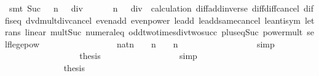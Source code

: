 \begin{isabellebody}
\ {\isacharparenleft}smt\ Suc{\isacharunderscore}{}\ {\isacartoucheopen}{\isacharparenleft}{}\ {\isacharcircum}\ n\ {\isacharminus}\ {}{\isacharparenright}\ div\ {}\ {\isacharminus}\ {}\ {\isacharequal}\ {\isacharparenleft}{}\ {\isacharcircum}\ n\ {\isacharminus}\ {}{\isacharparenright}\ div\ {}{\isacartoucheclose}\ calculation\ diff{\isacharunderscore}add{\isacharunderscore}inverse{}\ diff{\isacharunderscore}diff{\isacharunderscore}cancel\ diff{\isacharunderscore}is{\isacharunderscore}{}{\isacharunderscore}eq\ dvd{\isacharunderscore}mult{\isacharunderscore}div{\isacharunderscore}cancel\ even{\isacharunderscore}add\ even{\isacharunderscore}power\ le{\isacharunderscore}add{}\ le{\isacharunderscore}add{\isacharunderscore}same{\isacharunderscore}cancel{}\ le{\isacharunderscore}antisym\ le{\isacharunderscore}trans\ linear\ mult{\isacharunderscore}Suc\ numeral{\isacharunderscore}{}{\isacharunderscore}eq{\isacharunderscore}{}\ odd{\isacharunderscore}two{\isacharunderscore}times{\isacharunderscore}div{\isacharunderscore}two{\isacharunderscore}succ\ plus{\isacharunderscore}{}{\isacharunderscore}eq{\isacharunderscore}Suc\ power{\isacharunderscore}mult\ self{\isacharunderscore}le{\isacharunderscore}ge{}{\isacharunderscore}pow{\isacharparenright}\isanewline
\ \ \ \ \ \ \ \ \ \ \ \ \ \ \isamarkupfalse%
\ \isamarkupfalse%
\ {\isachardoublequoteopen}{\isacharparenleft}{\isacharparenleft}{}{\isacharcolon}{\isacharcolon}nat{\isacharparenright}{\isacharasterisk}{}{\isacharcircum}n\ {\isacharminus}\ {}{\isacharparenright}\ {\isacharplus}\ {\isacharparenleft}{}{\isacharcircum}n\ {\isacharplus}\ {}{\isacharparenright}\ {\isacharequal}\ {}{\isacharasterisk}{}{\isacharcircum}n{\isachardoublequoteclose}\isanewline
\ \ \ \ \ \ \ \ \ \ \ \ \ \ \ \ \isamarkupfalse%
\ simp\isanewline
\ \ \ \ \ \ \ \ \ \ \ \ \ \ \isamarkupfalse%
\ \isamarkupfalse%
\ {\isacharquery}thesis\isanewline
\ \ \ \ \ \ \ \ \ \ \ \ \ \ \ \ \isamarkupfalse%
\ simp\isanewline
\ \ \ \ \ \ \ \ \ \ \ \ \isamarkupfalse%
\isanewline
\ \ \ \ \ \ \ \ \ \ \ \ \isamarkupfalse%
\isanewline
\ \ \ \ \ \ \ \ \ \ \ \ \isamarkupfalse%
\ {\isacharquery}thesis\isanewline
\ \ \ \ \ \ \ \ \ \ \ \ \ \ \isacommand{{\isachardot}}\isamarkupfalse%

\end{isabellebody}
